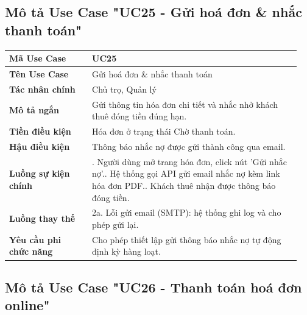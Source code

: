 \subsection{Mô tả Use Case "UC25 - Gửi hoá đơn \& nhắc thanh toán"}

\begin{longtable}[]{@{}>{\RaggedRight\arraybackslash}p{0.27\linewidth}>{\RaggedRight\arraybackslash}p{0.68\linewidth}@{}}
\toprule
\textbf{Mã Use Case} & UC25\tabularnewline
\midrule
\endhead
\textbf{Tên Use Case} & Gửi hoá đơn \& nhắc thanh toán\tabularnewline
\textbf{Tác nhân chính} & Chủ trọ, Quản lý\tabularnewline
\textbf{Mô tả ngắn} & Gửi thông tin hóa đơn chi tiết và nhắc nhở khách
thuê đóng tiền đúng hạn.\tabularnewline
\textbf{Tiền điều kiện} & Hóa đơn ở trạng thái Chờ thanh
toán.\tabularnewline
\textbf{Hậu điều kiện} & Thông báo nhắc nợ được gửi thành công qua
email.\tabularnewline
\textbf{Luồng sự kiện chính} & 1. Người dùng mở trang
hóa đơn, click nút 'Gửi nhắc nợ'.\newline 2. Hệ thống gọi API gửi
email nhắc nợ kèm link hóa đơn PDF.\newline 3. Khách thuê nhận được
thông báo đóng tiền.\tabularnewline
\textbf{Luồng thay thế} & 2a. Lỗi gửi email (SMTP): hệ thống ghi log và
cho phép gửi lại.\tabularnewline
\textbf{Yêu cầu phi chức năng} & Cho phép thiết lập gửi thông báo nhắc
nợ tự động định kỳ hàng loạt.\tabularnewline
\bottomrule
\end{longtable}

\subsection{Mô tả Use Case "UC26 - Thanh toán hoá đơn online"}

